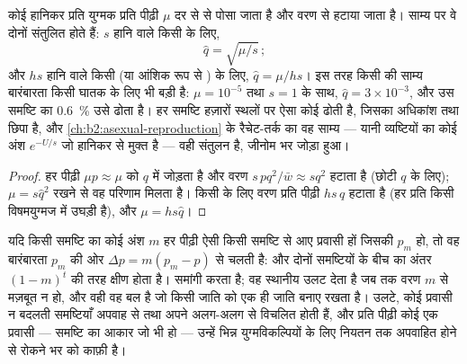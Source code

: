 \begin{theorem}[उत्परिवर्तन--वरण संतुलन]\label{thm:b2:population-genetics:balance}
कोई हानिकर  प्रति युग्मक प्रति पीढ़ी $\mu$ दर से  से
पोसा जाता है और वरण से हटाया जाता है। साम्य पर वे दोनों
संतुलित होते हैं: $s$  हानि वाले किसी   के लिए,
\[
\hat q = \sqrt{\mu/s}\,;
\]
और $hs$  हानि वाले किसी  (या आंशिक रूप से ) 
के लिए, $\hat q = \mu/hs$। इस तरह किसी
 की साम्य बारंबारता किसी घातक के लिए भी बड़ी है: $\mu = 10^{-5}$ तथा
$s = 1$ के साथ, $\hat q = 3\times 10^{-3}$, और उस समष्टि का \qty{0.6}{\%}
उसे ढोता है। हर समष्टि हज़ारों स्थलों पर ऐसा कोई \emph{}
ढोती है, जिसका अधिकांश  तथा छिपा है, और
\cref{ch:b2:asexual-reproduction} के रैचेट-तर्क का वह साम्य
--- यानी व्यष्टियों का कोई अंश $e^{-U/s}$ जो हानिकर
 से मुक्त है --- वही संतुलन है, जीनोम भर जोड़ा हुआ।
\end{theorem}
\begin{proof}
हर पीढ़ी  $\mu p \approx \mu$ को $q$ में जोड़ता है और
वरण $s\,pq^{2}/\bar w \approx sq^{2}$ हटाता है (छोटी $q$ के लिए);
$\mu = s\hat q^{2}$ रखने से वह  परिणाम मिलता है। किसी
  के लिए वरण प्रति पीढ़ी $hs\,q$ हटाता है (हर प्रति
किसी विषमयुग्मज में उघड़ी है), और $\mu = hs\hat q$।
\end{proof}

\begin{proposition}[प्रवास और एक-प्रवासी नियम]\label{prop:b2:population-genetics:migration}
यदि किसी समष्टि का कोई अंश $m$ हर पीढ़ी ऐसी किसी समष्टि से आए प्रवासी हों
जिसकी  $p_{m}$ हो, तो वह बारंबारता $p_{m}$ की ओर
$\Delta p = m(p_{m} - p)$ से चलती है: और दोनों समष्टियों के बीच का
अंतर $(1 - m)^{t}$ की तरह क्षीण होता है।
\emph{} समांगी करता है; वह स्थानीय  उलट देता है जब तक वरण
$m$ से मज़बूत न हो, और वही वह बल है जो किसी जाति को एक ही
जाति बनाए रखता है। उलटे, कोई प्रवासी न बदलती समष्टियाँ
अपवाह से तथा अपने अलग-अलग  से विचलित होती हैं, और प्रति पीढ़ी कोई एक
प्रवासी --- समष्टि का आकार जो भी हो --- उन्हें भिन्न युग्मविकल्पियों के लिए
नियतन तक अपवाहित होने से रोकने भर को काफ़ी है।
\end{proposition}

